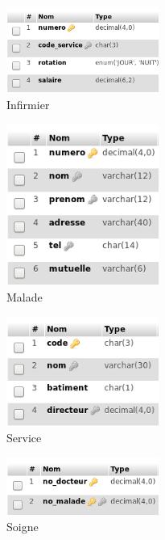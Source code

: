 \begin{figure}
 \centering
 \includegraphics[width=5cm]{./Ehopital_6.png}
 \caption{Infirmier}
 \label{fig:hop_6}
\end{figure}
\begin{figure}
 \centering
 \includegraphics[width=5cm]{./Ehopital_7.png}
 \caption{Malade}
 \label{fig:hop_7}
\end{figure}
\begin{figure}
 \centering
 \includegraphics[width=5cm]{./Ehopital_8.png}
 \caption{Service}
 \label{fig:hop_8}
\end{figure}
\begin{figure}
 \centering
 \includegraphics[width=5cm]{./Ehopital_9.png}
 \caption{Soigne}
 \label{fig:hop_9}
\end{figure}



